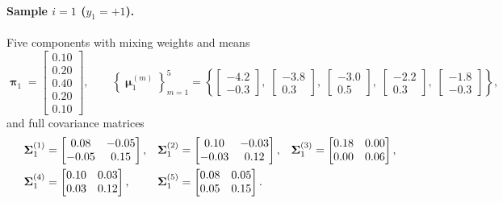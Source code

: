 \documentclass[11pt, letterpaper]{article}
\newcommand{\bSigma}{\vb{\Sigma}}
\newcommand{\bpi}{\boldsymbol{\uppi}}
\newcommand{\bmu}{\boldsymbol{\upmu}}
\begin{document}
\paragraph{Sample $i = 1$ ($y_1 = +1$).} Five components with mixing weights and means
\begin{equation}
    \bpi_1 = \begin{bmatrix} 0.10 \\ 0.20 \\ 0.40 \\ 0.20 \\ 0.10 \end{bmatrix},
    \qquad
    \left\{\bmu_1^{(m)}\right\}_{m=1}^{5} =
    \left\{
        \begin{bmatrix} -4.2 \\ -0.3 \end{bmatrix},\;
        \begin{bmatrix} -3.8 \\  0.3 \end{bmatrix},\;
        \begin{bmatrix} -3.0 \\  0.5 \end{bmatrix},\;
        \begin{bmatrix} -2.2 \\  0.3 \end{bmatrix},\;
        \begin{bmatrix} -1.8 \\ -0.3 \end{bmatrix}
    \right\},
\end{equation}
and full covariance matrices
\begin{align}
    \bSigma_1^{(1)} &= \begin{bmatrix} 0.08 & -0.05 \\ -0.05 & 0.15 \end{bmatrix}, &
    \bSigma_1^{(2)} &= \begin{bmatrix} 0.10 & -0.03 \\ -0.03 & 0.12 \end{bmatrix}, &
    \bSigma_1^{(3)} &= \begin{bmatrix} 0.18 & 0.00 \\ 0.00 & 0.06 \end{bmatrix}, \notag \\
    \bSigma_1^{(4)} &= \begin{bmatrix} 0.10 & 0.03 \\ 0.03 & 0.12 \end{bmatrix}, &
    \bSigma_1^{(5)} &= \begin{bmatrix} 0.08 & 0.05 \\ 0.05 & 0.15 \end{bmatrix}. &&
\end{align}
\end{document}
